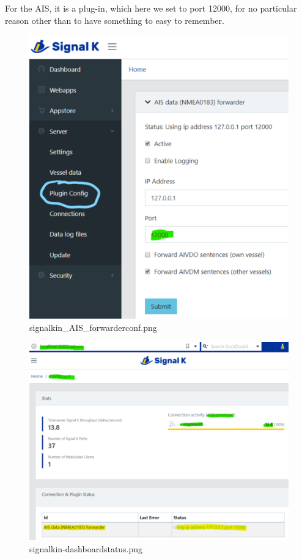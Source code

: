 \documentclass[11pt]{article}
\begin{document}
    For the AIS, it is a plug-in, which here we set to port 12000, for no
particular reason other than to have something to easy to remember.

    \begin{figure}
\centering
\includegraphics{signalkin_AIS_forwarderconf.png}
\caption{signalkin\_AIS\_forwarderconf.png}
\end{figure}

    \begin{figure}
\centering
\includegraphics{signalkin-dashboardstatus.png}
\caption{signalkin-dashboardstatus.png}
\end{figure}
\end{document}
